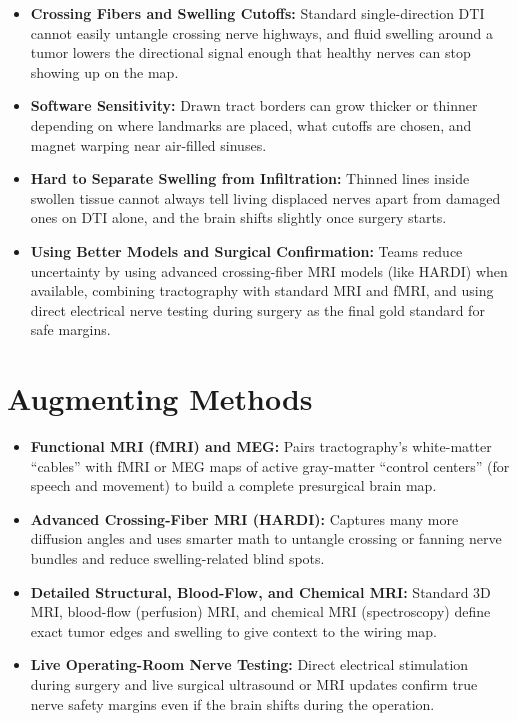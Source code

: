 \begin{itemize}
    \item \textbf{Crossing Fibers and Swelling Cutoffs:} Standard single-direction DTI cannot easily untangle crossing nerve highways, and fluid swelling around a tumor lowers the directional signal enough that healthy nerves can stop showing up on the map.
    \item \textbf{Software Sensitivity:} Drawn tract borders can grow thicker or thinner depending on where landmarks are placed, what cutoffs are chosen, and magnet warping near air-filled sinuses.
    \item \textbf{Hard to Separate Swelling from Infiltration:} Thinned lines inside swollen tissue cannot always tell living displaced nerves apart from damaged ones on DTI alone, and the brain shifts slightly once surgery starts.
    \item \textbf{Using Better Models and Surgical Confirmation:} Teams reduce uncertainty by using advanced crossing-fiber MRI models (like HARDI) when available, combining tractography with standard MRI and fMRI, and using direct electrical nerve testing during surgery as the final gold standard for safe margins.
\end{itemize}

\section{Augmenting Methods}

\begin{itemize}
    \item \textbf{Functional MRI (fMRI) and MEG:} Pairs tractography's white-matter ``cables'' with fMRI or MEG maps of active gray-matter ``control centers'' (for speech and movement) to build a complete presurgical brain map.
    \item \textbf{Advanced Crossing-Fiber MRI (HARDI):} Captures many more diffusion angles and uses smarter math to untangle crossing or fanning nerve bundles and reduce swelling-related blind spots.
    \item \textbf{Detailed Structural, Blood-Flow, and Chemical MRI:} Standard 3D MRI, blood-flow (perfusion) MRI, and chemical MRI (spectroscopy) define exact tumor edges and swelling to give context to the wiring map.
    \item \textbf{Live Operating-Room Nerve Testing:} Direct electrical stimulation during surgery and live surgical ultrasound or MRI updates confirm true nerve safety margins even if the brain shifts during the operation.
\end{itemize}

